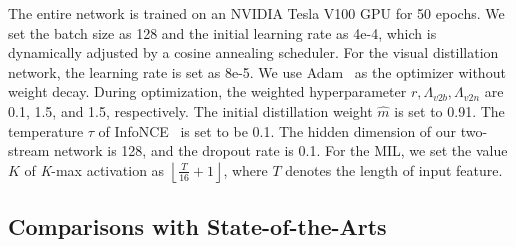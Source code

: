 \documentclass[sigconf]{acmart}
\begin{document}
The entire network is trained on an NVIDIA Tesla V100 GPU for 50 epochs. We set the batch size as 128 and the initial learning rate as 4e-4, which is dynamically adjusted by a cosine annealing scheduler. For the visual distillation network, the learning rate is set as 8e-5. We use Adam~\cite{kingma2014adam} as the optimizer without weight decay. During optimization, the weighted hyperparameter $r, \Lambda_{v2b}, \Lambda_{v2n}$ are 0.1, 1.5, and 1.5, respectively. The initial distillation weight $\hat{m}$ is set to 0.91. The temperature $\tau$ of InfoNCE~\cite{van2018representation} is set to be 0.1. The hidden dimension of our two-stream network is 128, and the dropout rate is 0.1. For the MIL, we set the value $K$ of \textit{K}-max activation as $\left \lfloor \frac{T}{16} + 1 \right \rfloor$, where $T$ denotes the length of input feature.

\subsection{Comparisons with State-of-the-Arts}
\end{document}
